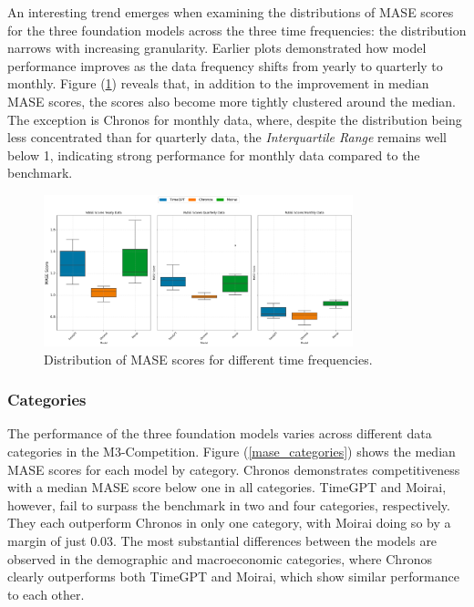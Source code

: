 \documentclass[12pt,a4paper]{article}
\begin{document}
An interesting trend emerges when examining the distributions of MASE scores for the three foundation models across the three time frequencies: the distribution narrows with increasing granularity. Earlier plots demonstrated how model performance improves as the data frequency shifts from yearly to quarterly to monthly. Figure (\ref{mase_distribution}) reveals that, in addition to the improvement in median MASE scores, the scores also become more tightly clustered around the median. The exception is Chronos for monthly data, where, despite the distribution being less concentrated than for quarterly data, the \textit{Interquartile Range} remains well below 1, indicating strong performance for monthly data compared to the benchmark.

\begin{figure}[htbp]
  \centering
  \includegraphics[width=0.8\textwidth]{mase_distributions_frequency.png}
  \caption{Distribution of MASE scores for different time frequencies.}
  \label{mase_distribution}
\end{figure}

\subsubsection{Categories}

The performance of the three foundation models varies across different data categories in the M3-Competition. Figure (\ref{mase_categories}) shows the median MASE scores for each model by category. Chronos demonstrates competitiveness with a median MASE score below one in all categories. TimeGPT and Moirai, however, fail to surpass the benchmark in two and four categories, respectively. They each outperform Chronos in only one category, with Moirai doing so by a margin of just 0.03. The most substantial differences between the models are observed in the demographic and macroeconomic categories, where Chronos clearly outperforms both TimeGPT and Moirai, which show similar performance to each other.
\end{document}
